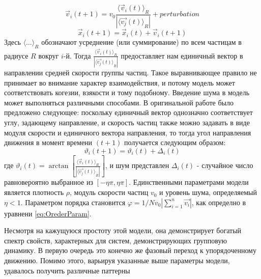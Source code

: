            \begin{equation}
                \vec{v}_i(t+1) = v_0 \frac{{\langle \vec{v}_i(t) \rangle}_R}{|{\langle \vec{v_j}(t) \rangle}_R|} + perturbation
            \end{equation}
            \begin{equation}
                \vec{x}_i(t+1) = \vec{x}_i(t)+\vec{v}_i(t+1)
            \end{equation}
            Здесь ${\langle \dots \rangle}_R$ обозначают усреднение (или суммирование) по всем частицам в радиусе $R$ вокруг $i$-й. Тогда $ \frac{{\langle \vec{v}_i(t) \rangle}_R}{|{\langle \vec{v_j}(t) \rangle}_R|}$ предоставляет нам единичный вектор в направлении средней скорости группы частиц. Такое выравнивающее правило не принимает во внимание характер взаимодействия, и потому модель может соответствовать когезии, взякости и тому подобному. Введение шума в модель может выполняться различными способами. В оригинальной работе было предложено следующее: поскольку единичный вектор однозначно соответствует углу, задающему направление, и скорость частиц также можно задавать в виде модуля скорости и единичного вектора направления, то тогда угол направления движения в момент времени $(t+1)$ получается следующим образом:
            \begin{equation}
                \vartheta_i (t+1) = \vartheta_i(t) + \Delta_i(t)
            \end{equation}
            где $\vartheta_i(t) = \arctan [{\frac{{\langle \vec{v}_i(t) \rangle}_R}{|{\langle \vec{v_j}(t) \rangle}_R|}}]$, и шум представлен $\Delta_i(t)$ - случайное число равновероятно выбранное из $[-\eta \pi,\eta \pi]$. Единственными параметрами модели является плотность $\rho$, модуль скорости частиц $v_0$ и уровень шума, определяемый $\eta < 1$. Параметром порядка становится 
            $\varphi = 1/{N v_0} |{\sum\limits_{i=1}^n \vec{v_i}}|$, как определно в уравнени \ref{eq:OrederParam}.

            Несмотря на кажущуюся простоту этой модели, она демонстрирует богатый спектр свойств, характерных для систем, демонстрирующих групповую динамику. В первую очередь это конечно же фазовый переход к упорядоченному движению. Помимо этого, варьируя указанные выше параметры модели, удавалось получить различные паттерны

